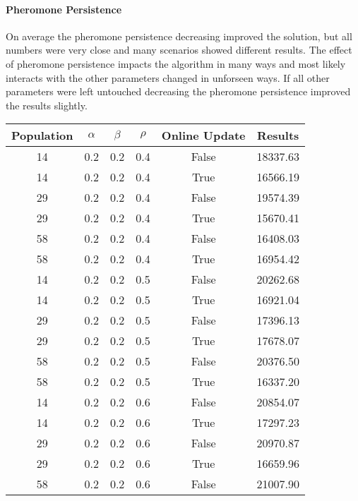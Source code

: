 \documentclass[12pt]{article}
\begin{document}
\paragraph{Pheromone Persistence}
On average the pheromone persistence decreasing improved the solution, but all numbers were very close and many scenarios showed different results. The effect of pheromone persistence impacts the algorithm in many ways and most likely interacts with the other parameters changed in unforseen ways. If all other parameters were left untouched decreasing the pheromone persistence improved the results slightly.

\begin{table}[h!]
\centering
\begin{tabular}{|c|c|c|c|c|c|}
\hline
\textbf{Population} & $\alpha$ & $\beta$ & $\rho$ & \textbf{Online Update} & \textbf{Results} \\ \hline
14  &  0.2  &  0.2  &  0.4  &  False  &  18337.63\\ \hline
14  &  0.2  &  0.2  &  0.4  &  True  &  16566.19\\ \hline
29  &  0.2  &  0.2  &  0.4  &  False  &  19574.39\\ \hline
29  &  0.2  &  0.2  &  0.4  &  True  &  15670.41\\ \hline
58  &  0.2  &  0.2  &  0.4  &  False  &  16408.03\\ \hline
58  &  0.2  &  0.2  &  0.4  &  True  &  16954.42\\ \hline
14  &  0.2  &  0.2  &  0.5  &  False  &  20262.68\\ \hline
14  &  0.2  &  0.2  &  0.5  &  True  &  16921.04\\ \hline
29  &  0.2  &  0.2  &  0.5  &  False  &  17396.13\\ \hline
29  &  0.2  &  0.2  &  0.5  &  True  &  17678.07\\ \hline
58  &  0.2  &  0.2  &  0.5  &  False  &  20376.50\\ \hline
58  &  0.2  &  0.2  &  0.5  &  True  &  16337.20\\ \hline
14  &  0.2  &  0.2  &  0.6  &  False  &  20854.07\\ \hline
14  &  0.2  &  0.2  &  0.6  &  True  &  17297.23\\ \hline
29  &  0.2  &  0.2  &  0.6  &  False  &  20970.87\\ \hline
29  &  0.2  &  0.2  &  0.6  &  True  &  16659.96\\ \hline
58  &  0.2  &  0.2  &  0.6  &  False  &  21007.90\\ \hline

\end{tabular}
\end{table}
\end{document}
